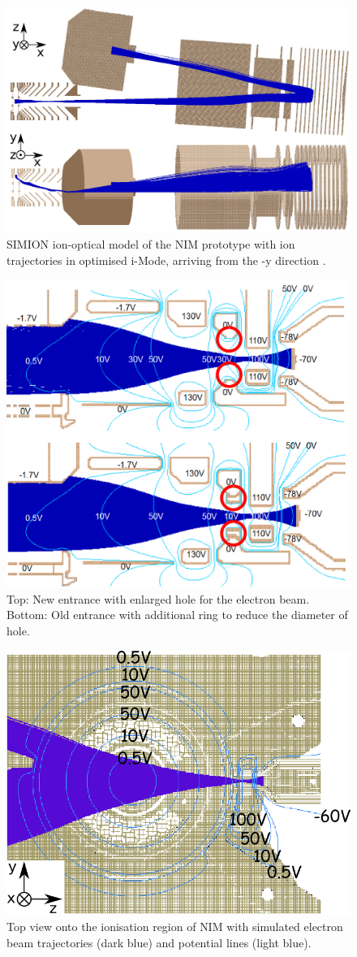 	\begin{figure}[h] %
		\centering
		\includegraphics[width=.8\textwidth]{Experiments/Ionflys_imode.png}
		\caption{SIMION ion-optical model of the NIM prototype with ion trajectories in optimised i-Mode, arriving from the -y direction \cite{Diss_Meyer}.}
		\label{fig:iModeIonFlyStefan}
	\end{figure}
	\begin{figure}[h!] %
		\centering
		\includegraphics[width=.7\textwidth]{Experiments/IS_adaption.png}
		\caption{Top: New entrance with enlarged hole for the electron beam. Bottom: Old entrance with additional ring to reduce the diameter of hole.}
		\label{fig:IsAdapt}
	\end{figure}
	\begin{figure}[h]
		\centering
		\includegraphics[width=.5\textwidth]{Experiments/IS_adaption_TopView.png}
		\caption{Top view onto the ionisation region of NIM with simulated electron beam trajectories (dark blue) and potential lines (light blue).}
		\label{fig:IsAdaptTop}
	\end{figure}
